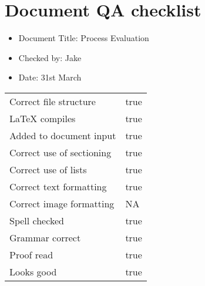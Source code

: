 \documentclass[14pt]{article}
\begin{document}
\section*{Document QA checklist}
\Large
\begin{itemize}
\item Document Title: Process Evaluation
\item Checked by: Jake
\item Date: 31st March
\end{itemize}
\Large
\begin{tabularx}{\textwidth}{ X | X }
Correct file structure &  true\\
\LaTeX \hspace{4pt} compiles & true\\
Added to document input & true\\
Correct use of sectioning & true\\
Correct use of lists & true\\
Correct text formatting & true\\
Correct image formatting & NA\\
Spell checked & true\\
Grammar correct & true\\
Proof read & true\\
Looks good & true\\
\end{tabularx}
\end{document}
